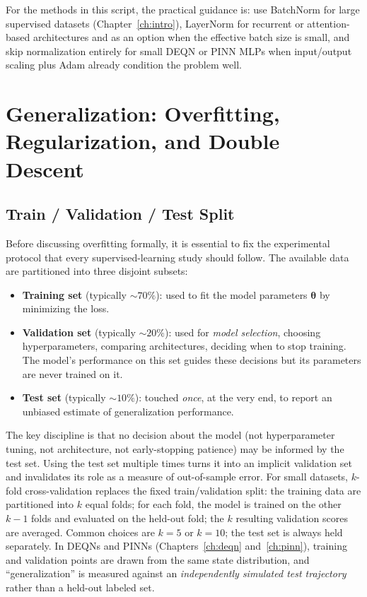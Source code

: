\documentclass[11pt,a4paper]{report}
\begin{document}
For the methods in this script, the practical guidance is: use BatchNorm for large supervised datasets (Chapter~\ref{ch:intro}), LayerNorm for recurrent or attention-based architectures and as an option when the effective batch size is small, and skip normalization entirely for small DEQN or PINN MLPs when input/output scaling plus Adam already condition the problem well.

\section{Generalization: Overfitting, Regularization, and Double Descent}
\label{sec:generalization}

\subsection{Train / Validation / Test Split}
\label{sec:traintest}

Before discussing overfitting formally, it is essential to fix the experimental protocol that every supervised-learning study should follow.  The available data are partitioned into three disjoint subsets:
\begin{itemize}\itemsep2pt
\item \textbf{Training set} (typically $\sim 70\%$): used to fit the model parameters $\bm{\theta}$ by minimizing the loss.
\item \textbf{Validation set} (typically $\sim 20\%$): used for \emph{model selection}, choosing hyperparameters, comparing architectures, deciding when to stop training.  The model's performance on this set guides these decisions but its parameters are never trained on it.
\item \textbf{Test set} (typically $\sim 10\%$): touched \emph{once}, at the very end, to report an unbiased estimate of generalization performance.
\end{itemize}
The key discipline is that no decision about the model (not hyperparameter tuning, not architecture, not early-stopping patience) may be informed by the test set.  Using the test set multiple times turns it into an implicit validation set and invalidates its role as a measure of out-of-sample error.  For small datasets, $k$-fold cross-validation replaces the fixed train/validation split: the training data are partitioned into $k$ equal folds; for each fold, the model is trained on the other $k-1$ folds and evaluated on the held-out fold; the $k$ resulting validation scores are averaged.  Common choices are $k = 5$ or $k = 10$; the test set is always held separately.  In DEQNs and PINNs (Chapters~\ref{ch:deqn} and~\ref{ch:pinn}), training and validation points are drawn from the same state distribution, and ``generalization'' is measured against an \emph{independently simulated test trajectory} rather than a held-out labeled set.
\end{document}
